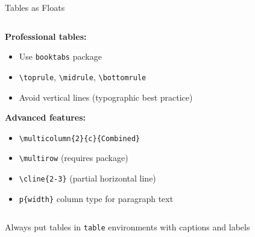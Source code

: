 \begin{frame}[fragile]{Tables as Floats}
\begin{columns}
\begin{column}{0.5\textwidth}
               \textbf{Professional tables:}
               \begin{itemize}
                    \item Use \texttt{booktabs} package
                    \item \texttt{\textbackslash toprule}, \texttt{\textbackslash midrule}, \texttt{\textbackslash bottomrule}
                    \item Avoid vertical lines (typographic best practice)
               \end{itemize}
               
               \textbf{Advanced features:}
               \begin{itemize}
                    \item \texttt{\textbackslash multicolumn\{2\}\{c\}\{Combined\}}
                    \item \texttt{\textbackslash multirow} (requires package)
                    \item \texttt{\textbackslash cline\{2-3\}} (partial horizontal line)
                    \item \texttt{p\{width\}} column type for paragraph text
               \end{itemize}
          \end{column}
     \end{columns}
     
     \begin{tip}
          Always put tables in \texttt{table} environments with captions and labels
     \end{tip}
\end{frame}

